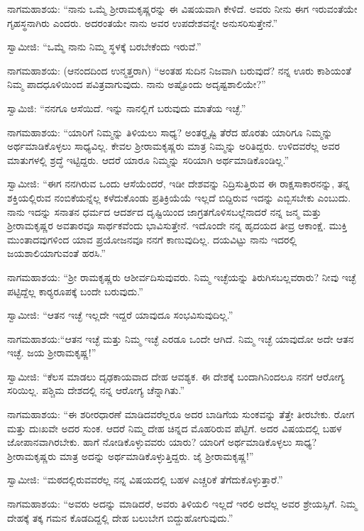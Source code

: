  ನಾಗಮಹಾಶಯ: “ನಾನು ಒಮ್ಮೆ ಶ‍್ರೀರಾಮಕೃಷ್ಣರನ್ನು ಈ ವಿಷಯವಾಗಿ ಕೇಳಿದೆ. ಅವರು ನೀನು ಈಗ ಇರುವಂತೆಯೇ ಗೃಹಸ್ಥನಾಗಿರು ಎಂದರು. ಅದರಂತಯೇ ನಾನು ಅವರ ಉಪದೇಶವನ್ನೇ ಅನುಸರಿಸುತ್ತೇನೆ.” 

 ಸ್ವಾಮೀಜಿ: “ಒಮ್ಮೆ ನಾನು ನಿಮ್ಮ ಸ್ಥಳಕ್ಕೆ ಬರಬೇಕೆಂದು ಇರುವೆ.” 

 ನಾಗಮಹಾಶಯ: (ಆನಂದದಿಂದ ಉನ್ಮತ್ತರಾಗಿ) “ಅಂತಹ ಸುದಿನ ನಿಜವಾಗಿ ಬರುವುದೆ? ನನ್ನ ಊರು ಕಾಶಿಯಂತೆ ನಿಮ್ಮ ಪಾದಧೂಳಿಯಿಂದ ಪವಿತ್ರವಾಗುವುದು. ನಾನು ಅಷ್ಟೊಂದು ಅದೃಷ್ಟಶಾಲಿಯೇ?” 

 ಸ್ವಾಮಿಜಿ: “ನನಗೂ ಆಸೆಯಿದೆ. ಇನ್ನು ನಾನಲ್ಲಿಗೆ ಬರುವುದು ಮಾತೆಯ ಇಚ್ಛೆ.” 

 ನಾಗಮಹಾಶಯ: “ಯಾರಿಗೆ ನಿಮ್ಮನ್ನು ತಿಳಿಯಲು ಸಾಧ್ಯ? ಅಂತರ್‍ದೃಷ್ಟಿ ತೆರೆದ ಹೊರತು ಯಾರಿಗೂ ನಿಮ್ಮನ್ನು ಅರ್ಥಮಾಡಿಕೊಳ್ಳಲು ಸಾಧ್ಯವಿಲ್ಲ. ಕೇವಲ ಶ‍್ರೀರಾಮಕೃಷ್ಣರು ಮಾತ್ರ ನಿಮ್ಮನ್ನು ಅರಿತಿದ್ದರು. ಉಳಿದವರೆಲ್ಲ ಅವರ ಮಾತುಗಳಲ್ಲಿ ಶ್ರದ್ಧೆ ಇಟ್ಟಿದ್ದರು. ಆದರೆ ಯಾರೂ ನಿಮ್ಮನ್ನು ಸರಿಯಾಗಿ ಅರ್ಥಮಾಡಿಕೊಂಡಿಲ್ಲ.” 

 ಸ್ವಾಮೀಜಿ: “ಈಗ ನನಗಿರುವ ಒಂದು ಆಸೆಯೆಂದರೆ, ಇಡೀ ದೇಶವನ್ನು ನಿದ್ರಿಸುತ್ತಿರುವ ಈ ರಾಕ್ಷಸಾಕಾರನನ್ನು, ತನ್ನ ಶಕ್ತಿಯಲ್ಲಿರುವ ನಂಬಿಕೆಯನ್ನೆಲ್ಲ ಕಳೆದುಕೊಂಡು ಪ್ರತಿಕ್ರಿಯೆಯೆ ಇಲ್ಲದೆ ಬಿದ್ದಿರುವ ಇದನ್ನು ಎಬ್ಬಿಸಬೇಕು ಎಂಬುದು. ನಾನು ಇದನ್ನು ಸನಾತನ ಧರ್ಮದ ಆದರ್ಶದ ದೃಷ್ಟಿಯಿಂದ ಜಾಗ್ರತಗೊಳಿಸಬಲ್ಲೆನಾದರೆ ನನ್ನ ಜನ್ಮ ಮತ್ತು ಶ‍್ರೀರಾಮಕೃಷ್ಣರ ಅವತಾರವೂ ಸಾರ್ಥಕವೆಂದು ಭಾವಿಸುತ್ತೇನೆ. ಇದೊಂದೇ ನನ್ನ ಹೃದಯದ ತೀವ್ರ ಆಕಾಂಕ್ಷೆ. ಮುಕ್ತಿ ಮುಂತಾದವುಗಳಿಂದ ಯಾವ ಪ್ರಯೋಜನವೂ ನನಗೆ ಕಾಣುವುದಿಲ್ಲ. ದಯವಿಟ್ಟು ನಾನು ಇದರಲ್ಲಿ ಜಯಶಾಲಿಯಾಗುವಂತೆ ಹರಸಿ.” 

 ನಾಗಮಹಾಶಯ: “ಶ‍್ರೀ ರಾಮಕೃಷ್ಣರು ಆಶೀರ್ವದಿಸುವುವರು. ನಿಮ್ಮ ಇಚ್ಛೆಯನ್ನು ತಿರುಗಿಸಬಲ್ಲವರಾರು? ನೀವು ಇಚ್ಛೆ ಪಟ್ಟಿದ್ದೆಲ್ಲ ಕಾರ‍್ಯರೂಪಕ್ಕೆ ಬಂದೇ‌ ಬರುವುದು.” 

 ಸ್ವಾಮೀಜಿ: “ಆತನ ಇಚ್ಛೆ ಇಲ್ಲದೇ ಇದ್ದರೆ ಯಾವುದೂ ಸಂಭವಿಸುವುದಿಲ್ಲ.” 

 ನಾಗಮಹಾಶಯ:‌“ಆತನ ಇಚ್ಛೆ ಮತ್ತು ನಿಮ್ಮ ಇಚ್ಛೆ ಎರಡೂ ಒಂದೇ ಆಗಿದೆ. ನಿಮ್ಮ ಇಚ್ಛೆ ಯಾವುದೋ ಅದೇ ಆತನ ಇಚ್ಛೆ. ಜಯ ಶ‍್ರೀರಾಮಕೃಷ್ಣ!” 

 ಸ್ವಾಮೀಜಿ: “ಕೆಲಸ ಮಾಡಲು ದೃಢಕಾಯವಾದ ದೇಹ ಆವಶ್ಯಕ. ಈ ದೇಶಕ್ಕೆ ಬಂದಾಗಿನಿಂದಲೂ ನನಗೆ ಆರೋಗ್ಯ ಸರಿಯಿಲ್ಲ. ಪಶ್ಚಿಮ ದೇಶದಲ್ಲಿ ನನ್ನ ಆರೋಗ್ಯ ಚೆನ್ನಾಗಿತು.” 

 ನಾಗಮಹಾಶಯ: “ಈ ಶರೀರಧಾರಣೆ ಮಾಡಿದವರೆಲ್ಲರೂ ಅದರ ಬಾಡಿಗೆಯ ಸುಂಕವನ್ನು ತೆತ್ತೇ ತೀರಬೇಕು. ರೋಗ ಮತ್ತು ದುಃಖವೇ ಅದರ ಸುಂಕ. ಆದರೆ ನಿಮ್ಮ ದೇಹ ಚಿನ್ನದ ಮೊಹರಿರುವ ಪೆಟ್ಟಿಗೆ. ಅದರ ವಿಷಯದಲ್ಲಿ ಬಹಳ ಜೋಪಾನವಾಗಿರಬೇಕು. ಹಾಗೆ ನೋಡಿಕೊಳ್ಳುವವರು ಯಾರು? ಯಾರಿಗೆ ಅರ್ಥಮಾಡಿಕೊಳ್ಳಲು ಸಾಧ್ಯ? ಶ‍್ರೀರಾಮಕೃಷ್ಣರು ಮಾತ್ರ ಅದನ್ನು ಅರ್ಥಮಾಡಿಕೊಳ್ಳುತ್ತಿದ್ದರು. ಜೈ ಶ‍್ರೀರಾಮಕೃಷ್ಣ!” 

 ಸ್ವಾಮೀಜಿ: “ಮಠದಲ್ಲಿರುವವರೆಲ್ಲ ನನ್ನ ವಿಷಯದಲ್ಲಿ ಬಹಳ ಎಚ್ಚರಿಕೆ ತೆಗೆದುಕೊಳ್ಳುತ್ತಾರೆ.” 

 ನಾಗಮಹಾಶಯ: “ಅವರು ಅದನ್ನು ಮಾಡಿದರೆ, ಅವರು ತಿಳಿಯಲಿ ಇಲ್ಲದೆ ಇರಲಿ ಅದೆಲ್ಲ ಅವರ ಶ್ರೇಯಸ್ಸಿಗೆ. ನಿಮ್ಮ ದೇಹಕ್ಕೆ ತಕ್ಕ ಗಮನ ಕೊಡದಿದ್ದಲ್ಲಿ ದೇಹ ಬಲುಬೇಗ ಬಿದ್ದುಹೋಗುವುದು.” 

